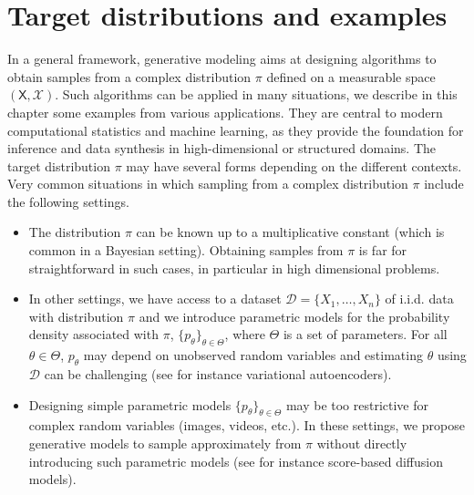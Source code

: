 \documentclass[english,graybox,envcountchap,envcountsame,sectrefs,shortlabels]{svmono}
\theoremstyle{style}
\begin{document}
\chapter{Target distributions and examples}
\minitoc
In a general framework, generative modeling aims at designing algorithms to obtain samples from a complex distribution $\pi$ defined on a measurable space $(\mathsf{X},\mathcal{X})$. Such algorithms can be applied in many situations, we describe in this chapter some examples from various applications. They are central to modern computational statistics and machine learning, as they provide the foundation for inference and data synthesis in high-dimensional or structured domains. The target distribution $\pi$ may have several forms depending on the different contexts. Very common situations in which sampling from a complex distribution $\pi$ include the following settings.
\begin{itemize}
\item The distribution $\pi$ can be known up to a multiplicative constant (which is common in a Bayesian setting).  Obtaining samples from $\pi$ is far for straightforward in such cases, in particular in high dimensional problems.
\item In other settings, we have access to a dataset $\mathcal{D} = \{X_1,\ldots,X_n\}$ of i.i.d. data with distribution $\pi$ and we introduce parametric models for the probability density associated with $\pi$, $\{p_\theta\}_{\theta\in\Theta}$, where $\Theta$ is a set of parameters. For all $\theta\in\Theta$, $p_\theta$ may depend on unobserved random variables and estimating $\theta$ using  $\mathcal{D}$ can be challenging (see for instance variational autoencoders). 
\item Designing simple parametric models $\{p_\theta\}_{\theta\in\Theta}$ may be too restrictive for complex random variables (images, videos, etc.). In these settings, we propose generative models to sample approximately from $\pi$ without directly introducing such parametric models (see for instance score-based diffusion models).
\end{itemize}

\end{document}
